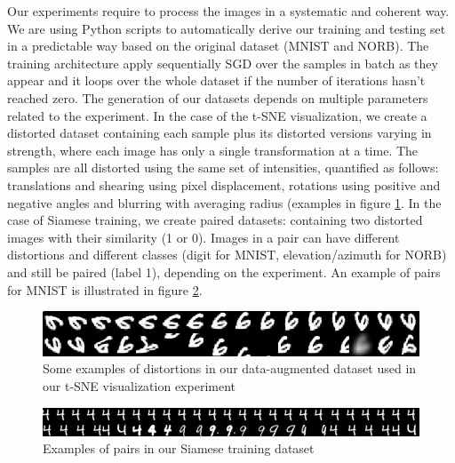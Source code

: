 \documentclass[a4paper,12pt]{report}
\begin{document}
Our experiments require to process the images in a systematic and coherent way.
We are using Python scripts to automatically derive our training and testing set in a predictable way based on the original dataset (MNIST and NORB).
The training architecture apply sequentially SGD over the samples in batch as they appear and it loops over the whole dataset if the number of iterations hasn't reached zero.
The generation of our datasets depends on multiple parameters related to the experiment.
In the case of the t-SNE visualization, we create a distorted dataset containing each sample plus its distorted versions varying in strength, where each image has only a single transformation at a time.
The samples are all distorted using the same set of intensities, quantified as follows: translations and shearing using pixel displacement, rotations using positive and negative angles and blurring with averaging radius (examples in figure \ref{fig:mnist_transfo_tsne}.
In the case of Siamese training, we create paired datasets: containing two distorted images with their similarity (1 or 0).
Images in a pair can have different distortions and different classes (digit for MNIST, elevation/azimuth for NORB) and still be paired (label 1), depending on the experiment.
An example of pairs for MNIST is illustrated in figure \ref{fig:mnist_pairs}.

\begin{figure}[h]
    \begin{center}
        \includegraphics{thesis_figures/mnist_transfo_tsne.jpg}
    \end{center}
    \caption{Some examples of distortions in our data-augmented dataset used in our t-SNE visualization experiment}
    \label{fig:mnist_transfo_tsne}
\end{figure}

\begin{figure}[h]
    \begin{center}
        \includegraphics{thesis_figures/mnist_pairs.jpg}
    \end{center}
    \caption{Examples of pairs in our Siamese training dataset}
    \label{fig:mnist_pairs}
\end{figure}
\end{document}
